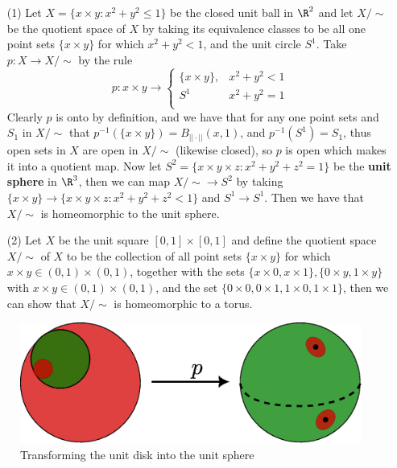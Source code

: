 \begin{example}
    \begin{enumerate}
        \item[(1)] Let $X=\{x \times y: x^2+y^2 \leq 1\}$ be the closed unit ball in $\R^2$ and let  $X/\sim$ be the
    quotient space of  $X$ by taking its equivalence classes to be all one point sets  $\{x \times
    y\}$ for which $x^2+y^2<1$, and the unit circle  $S^1$. Take  $p:X \rightarrow X/\sim$ by the
    rule
        \begin{equation*}
            p:x \times y \rightarrow \begin{cases}
                \{x \times y\}, & x^2+y^2<1 \\
                S^1        & x^2+y^2=1 \\
                      \end{cases}
        \end{equation*}
    Clearly $p$ is onto by definition, and we have that for any one point sets and  $ S_1$ in
    $X/\sim$ that  $p^{-1}(\{x \times y\})=B_{||\cdot||}(x,1)$, and $p^{-1}(S^1)=S_1$, thus open
    sets in $X$ are open in  $X/\sim$  (likewise closed), so $p$ is open which makes it into a
    quotient map. Now let  $S^2=\{x \times y \times z: x^2+y^2+z^2=1\}$ be the \textbf{unit sphere}
    in $\R^3$, then we can map  $X/\sim \rightarrow S^2$ by taking  $\{x \times y\} \rightarrow \{x
    \times y \times z: x^2+y^2+z^2<1\}$ and $ S^1 \rightarrow S^1$. Then we have that $X/\sim$ is
    homeomorphic to the unit sphere.

        \item[(2)] Let $X$ be the unit square  $[0,1] \times [0,1]$ and define the quotient space
            $X/\sim$ of $X$ to be the collection of all point sets $\{x \times y\}$ for which $x
            \times y \in (0,1) \times (0,1)$, together with the sets $\{x \times 0, x \times 1\},
            \{0 \times y, 1 \times y\}$ with $x \times y \in (0,1) \times (0,1)$, and the set $\{0
            \times 0, 0 \times 1, 1 \times 0, 1 \times 1\}$, then we can show that $X/\sim$ is
            homeomorphic to a torus.

    \end{enumerate}
\end{example}

\begin{figure}[h]
    \centering
    \includegraphics[scale = 0.5]{Figures/Chapter2/disk_to_sphere.eps}
    \caption{Transforming the unit disk into the unit sphere}
    \label{fig_2.4}
\end{figure}

